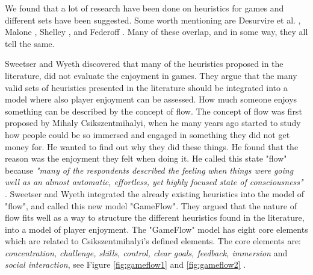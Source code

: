 We found that a lot of research have been done on heuristics for games and different sets have been suggested. Some worth mentioning are Desurvire et al. \cite{desurvire}, Malone \cite{malone}, Shelley \cite{shelley}, and Federoff \cite{federoff}. Many of these overlap, and in some way, they all tell the same. 

Sweetser and Wyeth \cite{sweetser} discovered that many of the heuristics proposed in the literature, did not evaluate the enjoyment in games. They argue that the many valid sets of heuristics presented in the literature should be integrated into a model where also player enjoyment can be assessed. How much someone enjoys something can be described by the concept of flow. The concept of flow was first proposed by  Mihaly Csikszentmihalyi, when he many years ago started  to study how people could be so immersed and engaged in something they did not get money for. He wanted to find out why they did these things. He found that the reason was the enjoyment they felt when doing it. He called this state "flow" because \emph{"many of the respondents described the feeling when things were going well as an almost automatic, effortless, yet highly focused state of consciousness"} \cite{flow}.  Sweetser and Wyeth integrated the already existing heuristics into the model of "flow", and called this new model "GameFlow".  They argued that the nature of flow fits well as a way to structure the different heuristics found in the literature, into a model of player enjoyment. The "GameFlow" model has eight core elements which are related to Csikszentmihalyi's defined elements. The core elements are: \emph{concentration, challenge, skills, control, clear goals, feedback, immersion} and \emph{social interaction}, see Figure \ref{fig:gameflow1} and \ref{fig:gameflow2} \cite{sweetser}. 


